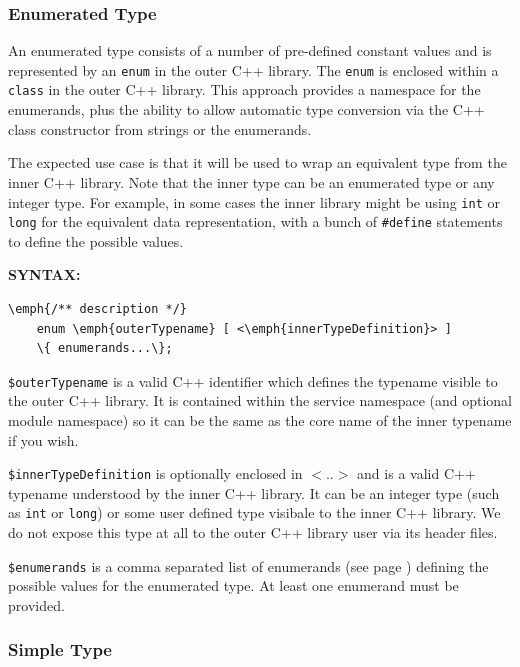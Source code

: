 \subsubsection{Enumerated Type} \label{enum}

An enumerated type consists of a number of pre-defined constant values and is represented by an \texttt{enum} in the outer C++ library. The \texttt{enum} is enclosed within a \texttt{class} in the outer C++ library. This approach provides a namespace for the enumerands, plus the ability to allow automatic type conversion via the C++ class constructor from strings or the enumerands.

The expected use case is that it will be used to wrap an equivalent type from the inner C++ library. Note that the inner type can be an enumerated type or any integer type. For example, in some cases the inner library might be using \texttt{int} or \texttt{long} for the equivalent data representation, with a bunch of \texttt{\#define} statements to define the possible values.


\textbf{SYNTAX:}
\nopagebreak
\begin{Verbatim}[commandchars=\\\{\}]
    \emph{/** description */}
    enum \emph{outerTypename} [ <\emph{innerTypeDefinition}> ]
    \{ enumerands...\}; 
\end{Verbatim}

\texttt{\$outerTypename} is a valid C++ identifier which defines the typename visible to the outer C++ library. It is contained within the service namespace (and optional module namespace) so it can be the same as the core name of the inner typename if you wish.

\texttt{\$innerTypeDefinition} is optionally enclosed in $<..>$ and is a valid C++ typename understood by the inner C++ library. It can be an integer type (such as \texttt{int} or \texttt{long}) or some user defined type visibale to the inner C++ library. We do not expose this type at all to the outer C++ library user via its header files.

\texttt{\$enumerands} is a comma separated list of enumerands (see page \pageref{enumerand}) defining the possible values for the enumerated type. At least one enumerand must be provided.


\subsubsection{Simple Type} \label{simpleType}

